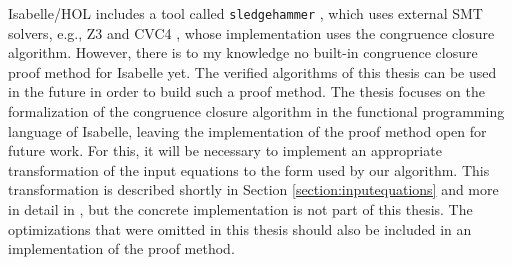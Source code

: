 Isabelle/HOL includes a tool called \lstinline|sledgehammer| \cite{sledgehammer}, which uses external SMT solvers, e.g., Z3 \cite{z3} and CVC4 \cite{cvc4}, whose implementation uses the congruence closure algorithm.
However, there is to my knowledge no built-in congruence closure proof method for Isabelle yet.
The verified algorithms of this thesis can be used in the future in order to build such a proof method.
The thesis focuses on the formalization of the congruence closure algorithm in the functional programming language of Isabelle, leaving the implementation of the proof method open for future work.
For this, it will be necessary to implement an appropriate transformation of the input equations to the form used by our algorithm.
This transformation is described shortly in Section \ref{section:inputequations} and more in detail in \cite{Nieuwenhuis}, but the concrete implementation is not part of this thesis.
The optimizations that were omitted in this thesis should also be included in an implementation of the proof method.
